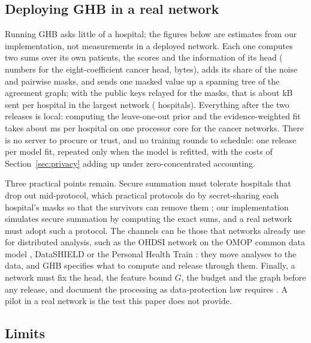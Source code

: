 \documentclass[acmsmall,screen,review]{acmart}
\theoremstyle{acmdefinition}
\begin{document}
\subsection{Deploying GHB in a real network}\label{sec:deploy}

Running GHB asks little of a hospital; the figures below are estimates from our implementation, not measurements in a deployed network. Each one computes two sums over its own patients, the scores and the information of its head (\SimDeployNums{} numbers for the eight-coefficient cancer head, \SimDeployBytes{} bytes), adds its share of the noise and pairwise masks, and sends one masked value up a spanning tree of the agreement graph; with the public keys relayed for the masks, that is about \SimDeployKB{} kB sent per hospital in the largest network (\SimDeployKmax{} hospitals). Everything after the two releases is local: computing the leave-one-out prior and the evidence-weighted fit takes about \SimDeployMs{} ms per hospital on one processor core for the cancer networks. There is no server to procure or trust, and no training rounds to schedule: one release per model fit, repeated only when the model is refitted, with the costs of Section~\ref{sec:privacy} adding up under zero-concentrated accounting.

Three practical points remain. Secure summation must tolerate hospitals that drop out mid-protocol, which practical protocols do by secret-sharing each hospital's masks so that the survivors can remove them \cite{bonawitz2017practical}; our implementation simulates secure summation by computing the exact sums, and a real network must adopt such a protocol. The channels can be those that networks already use for distributed analysis, such as the OHDSI network on the OMOP common data model \cite{hripcsak2015observational}, DataSHIELD \cite{gaye2014datashield} or the Personal Health Train \cite{beyan2020distributed,deist2020distributed}: they move analyses to the data, and GHB specifies what to compute and release through them. Finally, a network must fix the head, the feature bound $G$, the budget and the graph before any release, and document the processing as data-protection law requires \cite{ehds2025,gdpr2016}. A pilot in a real network is the test this paper does not provide.

\subsection{Limits}\label{sec:limits}
\end{document}

